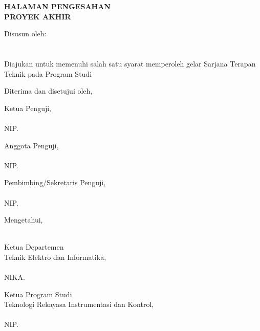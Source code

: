\newpage
\begin{center}
    \begin{doublespace}
        \textbf{\large \MakeUppercase{HALAMAN PENGESAHAN\\ PROYEK AKHIR}}
    \end{doublespace}
\end{center}

\begin{center}
        \textbf{\large \MakeUppercase {\judulid}}
\end{center}

\begin{center}
    Disusun oleh:\\
    \textbf{\penulis}\\
    \textbf{\nim}\\[0.5cm]

    Diajukan untuk memenuhi salah satu syarat memperoleh gelar Sarjana Terapan Teknik pada Program Studi {\prodi} {\departemen} {\fakultas} {\universitas}\\
\end{center}
\begin{center}
    Diterima dan disetujui oleh,
\end{center}
  \begin{minipage}{0.45\textwidth}
    Ketua Penguji,\\[2cm]\underline{\ketuapenguji}\\
    NIP. \NIPketuapenguji
\end{minipage}
\hfill
\begin{minipage}{0.45\textwidth}
    Anggota Penguji,\\[2cm]
    \underline{\anggotapenguji}\\
    NIP. \NIPanggotapenguji
\end{minipage}%
\begin{center}
    \centering
    \begin{minipage}{0.45\textwidth}
    Pembimbing/Sekretaris Penguji,\\[2cm]
    \underline{\sekretarispenguji}\\
    NIP. \NIPsekretarispenguji
\end{minipage}%
\end{center}
\begin{center}
    Mengetahui,
\end{center}
 \begin{minipage}{0.5\textwidth}
    \hfill\\[0.25cm]
    Ketua Departemen\\
    Teknik Elektro dan Informatika,\\[2cm]
    \underline{\koordepartemen}\\
    NIKA. \NIKAkoordepartemen
\end{minipage}
\hfill
\begin{minipage}{0.45\textwidth}
    Ketua Program Studi\\
    Teknologi Rekayasa
    Instrumentasi dan Kontrol,\\[2cm]
    \underline{\koorprodi}\\
    NIP. \NIPkoorprodi
\end{minipage}%